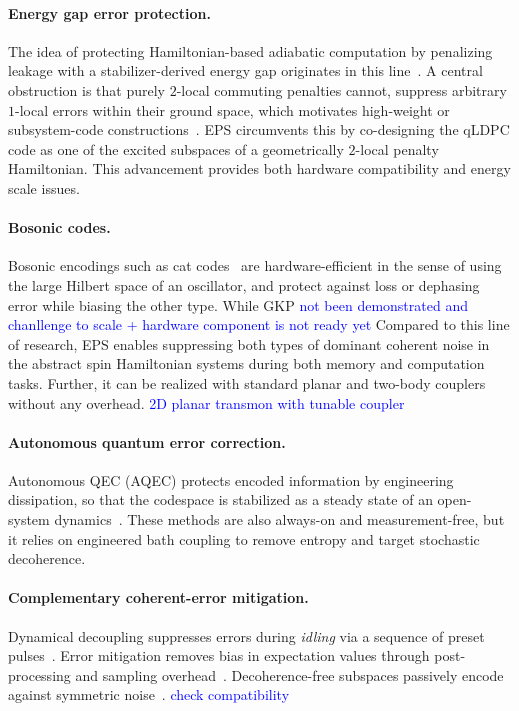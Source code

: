 \documentclass[%
10pt,tightenlines,
superscriptaddress,
 amsmath,amssymb,
 aps,
pra,
]{revtex4-2}
\newcommand{\sy}[1]{\textcolor{blue}{#1}}
\begin{document}
\paragraph{Energy gap error protection.}
The idea of protecting Hamiltonian-based adiabatic computation by penalizing leakage with a stabilizer-derived energy gap originates in this line~\cite{jordan2006error,young2013error,bookatz2015error}. A central obstruction is that purely $2$-local commuting penalties cannot, suppress arbitrary $1$-local errors within their ground space, which motivates high-weight or subsystem-code constructions~\cite{marvian2017error}. EPS circumvents this by co-designing the qLDPC code as one of the excited subspaces of a geometrically $2$-local penalty Hamiltonian. This advancement provides both hardware compatibility and energy scale issues.

\paragraph{Bosonic codes.}
Bosonic encodings such as cat codes~\cite{gottesman2001encoding,mirrahimi2014dynamically} are hardware-efficient in the sense of using the large Hilbert space of an oscillator, and protect against loss or dephasing error while biasing the other type. While GKP \sy{not been demonstrated and chanllenge to scale + hardware component is not ready yet} Compared to this line of research, EPS enables suppressing both types of dominant coherent noise in the abstract spin Hamiltonian systems during both memory and computation tasks. Further, it can be realized with standard planar and two-body couplers without any overhead. \sy{2D planar transmon with tunable coupler}

\paragraph{Autonomous quantum error correction.}
Autonomous QEC (AQEC) protects encoded information by engineering dissipation, so that the codespace is stabilized as a steady state of an open-system dynamics~\cite{lebreuilly2021autonomous,shtanko2025bounds}. These methods are also always-on and measurement-free, but it relies on engineered bath coupling to remove entropy and target stochastic decoherence.

\paragraph{Complementary coherent-error mitigation.}
Dynamical decoupling suppresses errors during \emph{idling} via a sequence of preset pulses~\cite{viola1999dynamical}. Error mitigation removes bias in expectation values through post-processing and sampling overhead~\cite{temme2017error,li2017efficient}. Decoherence-free subspaces passively encode against symmetric noise~\cite{lidar1998decoherence}. \sy{check compatibility}
\end{document}
